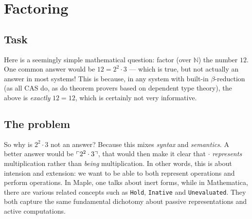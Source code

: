 \documentclass[fleqn]{llncs}
\newcommand{\NN}{\ensuremath{\mathbb{N}}}
\newcommand{\NRE}{\ensuremath{\mname{normRatExpr}}}
\begin{document}
\iffalse
syntax and semantics.  We have to be careful of \emph{which} semantics
is used to guide the syntactic manipulations, as different semantics
for the \textbf{same} expression can be inconsistent.

We are thus interested in the following questions:

\be

  \item What should the specification of the computational behavior of
    {\NRE} be?

  \item What is the mathematical meaning of {\NRE} be when {\NRE} is
    applied to the body of a rational function?

  \item What features of a logic are needed to express
    {\NRE}'s specification and mathematical meaning?

  \item What features of a logic would make expressing {\NRE}'s
    specification and mathematical meaning relatively straightforward?

\ee
\fi

\section{Factoring}

\subsection{Task}
Here is a seemingly simple mathematical question: factor (over $\NN$)
the number $12$. One common answer would be $12 = 2^2\cdot 3$ --- which
is true, but not actually an answer in most systems!  This is because, in
any system with built-in $\beta$-reduction (as all CAS do, as do theorem
provers based on dependent type theory), the above is \emph{exactly}
$12 = 12$, which is certainly not very informative.

\subsection{The problem}

So why is $2^2\cdot 3$ not an answer? Because this mixes \emph{syntax}
and \emph{semantics}. A better answer would be $\ulcorner2^2\cdot 3\urcorner$,
that would then make it clear that $\cdot$ \emph{represents} multiplication
rather than \emph{being} multiplication. In other words, this is
about intension and extension: we want to be able to both represent
operations and perform operations. In Maple, one talks about
\textsf{inert forms}, while in Mathematica, there are various related
concepts such as \texttt{Hold}, \texttt{Inative} and \texttt{Unevaluated}.
They both capture the same fundamental dichotomy about passive representations
and active computations.
\end{document}

